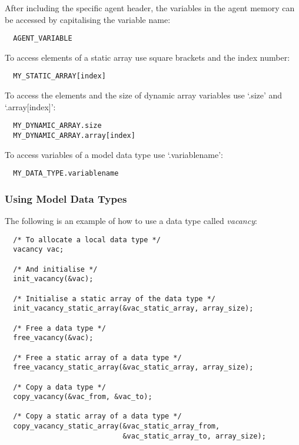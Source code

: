 After including the specific agent header, the variables in the
agent memory can be accessed by capitalising the variable name:

\begin{verbatim}
  AGENT_VARIABLE
\end{verbatim}

To access elements of a static array use square brackets and the index number:

\begin{verbatim}
  MY_STATIC_ARRAY[index]
\end{verbatim}

To access the elements and the size of dynamic array variables use
`.size' and `.array[index]':

\begin{verbatim}
  MY_DYNAMIC_ARRAY.size
  MY_DYNAMIC_ARRAY.array[index]
\end{verbatim}

To access variables of a model data type use `.variablename':

\begin{verbatim}
  MY_DATA_TYPE.variablename
\end{verbatim}

\subsubsection{Using Model Data Types}

The following is an example of how to use a data type called
\emph{vacancy}:

\begin{verbatim}
  /* To allocate a local data type */
  vacancy vac;
  
  /* And initialise */
  init_vacancy(&vac);
  
  /* Initialise a static array of the data type */
  init_vacancy_static_array(&vac_static_array, array_size);
  
  /* Free a data type */
  free_vacancy(&vac);
  
  /* Free a static array of a data type */
  free_vacancy_static_array(&vac_static_array, array_size);
  
  /* Copy a data type */
  copy_vacancy(&vac_from, &vac_to);
  
  /* Copy a static array of a data type */
  copy_vacancy_static_array(&vac_static_array_from,
                            &vac_static_array_to, array_size);
  \end{verbatim}

